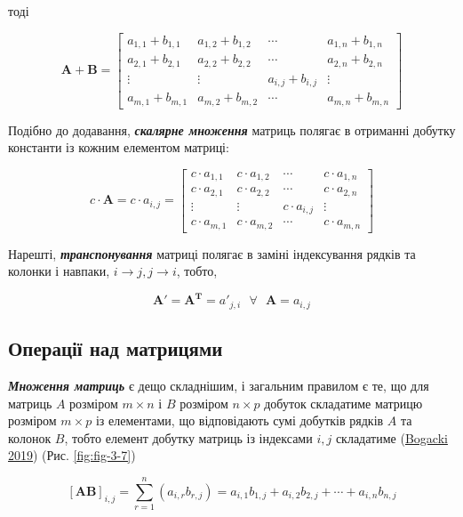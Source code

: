 \documentclass[
  11pt,
]{book}
\begin{document}
тоді

\[\mathbf{A} + \mathbf{B} = \begin{bmatrix}
a_{1, 1}+b_{1, 1} & a_{1,2}+b_{1,2} & \cdots & a_{1, n}+b_{1, n}\\
a_{2, 1}+b_{2, 1} & a_{2,2}+b_{2,2} & \cdots & a_{2, n}+b_{2, n}\\
\vdots & \vdots & a_{i,j}+b_{i,j} & \vdots \\
a_{m, 1}+b_{m, 1} & a_{m,2}+b_{m,2} & \cdots & a_{m, n}+b_{m, n}
\end{bmatrix}\]

Подібно до додавання, \textbf{\emph{скалярне множення}} матриць полягає в отриманні добутку константи із кожним елементом матриці:

\[c \cdot \mathbf{A} = c \cdot a_{i, j} = \begin{bmatrix}
c \cdot a_{1, 1} & c \cdot a_{1,2} & \cdots & c \cdot a_{1, n}\\
c \cdot a_{2, 1} & c \cdot  a_{2,2} & \cdots & c \cdot a_{2, n}\\
\vdots & \vdots & c \cdot a_{i,j} & \vdots \\
c \cdot a_{m, 1} & c \cdot a_{m,2} & \cdots & c \cdot a_{m, n}
\end{bmatrix}\]

Нарешті, \textbf{\emph{транспонування}} матриці полягає в заміні індексування рядків та колонки і навпаки, \(i \rightarrow j, j \rightarrow i\), тобто,

\[\mathbf{A'} = \mathbf{A^T} = a'_{j, i} \text{ } \forall \text{ } \mathbf{A} = a_{i, j}\]

\subsection{Операції над матрицями}\label{ux43eux43fux435ux440ux430ux446ux456ux457-ux43dux430ux434-ux43cux430ux442ux440ux438ux446ux44fux43cux438}

\textbf{\emph{Множення матриць}} є дещо складнішим, і загальним правилом є те, що для матриць \(A\) розміром \(m \times n\) і \(B\) розміром \(n \times p\) добуток складатиме матрицю розміром \(m \times p\) із елементами, що відповідають сумі добутків рядків \(A\) та колонок \(B\), тобто елемент добутку матриць із індексами \(i, j\) складатиме (\href{https://books.google.com/books/about/Linear_Algebra.html?id=P8BZzAEACAAJ}{Bogacki 2019}) (Рис. \ref{fig:fig-3-7})

\[[\mathbf{AB}]_{i, j} = \sum \limits_{r=1}^n (a_{i,r} b_{r, j}) = a_{i,1} b_{1, j} + a_{i, 2}b_{2, j} + \cdots + a_{i, n}b_{n, j}\]
\end{document}
